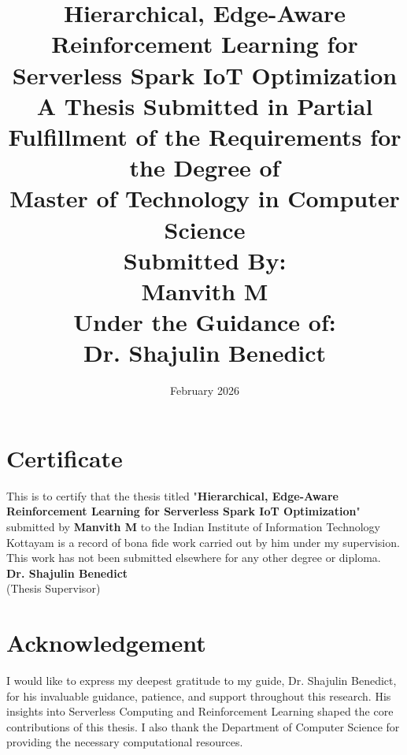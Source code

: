 \documentclass[12pt, a4paper]{report}
\title{\textbf{Hierarchical, Edge-Aware Reinforcement Learning for Serverless Spark IoT Optimization}\\
\vspace{1cm}
\large A Thesis Submitted in Partial Fulfillment of the Requirements for the Degree of\\
\textbf{Master of Technology in Computer Science}\\
\vspace{2cm}
\textbf{Submitted By:}\\
\textbf{Manvith M}\\
\vspace{1cm}
\textbf{Under the Guidance of:}\\
\textbf{Dr. Shajulin Benedict}}
\date{February 2026}
\begin{document}
\maketitle

\chapter*{Certificate}
This is to certify that the thesis titled "\textbf{Hierarchical, Edge-Aware Reinforcement Learning for Serverless Spark IoT Optimization}" submitted by \textbf{Manvith M} to the Indian Institute of Information Technology Kottayam is a record of bona fide work carried out by him under my supervision. This work has not been submitted elsewhere for any other degree or diploma.
\vspace{3cm}
\\
\textbf{Dr. Shajulin Benedict}\\
(Thesis Supervisor)
\clearpage

\chapter*{Acknowledgement}
I would like to express my deepest gratitude to my guide, Dr. Shajulin Benedict, for his invaluable guidance, patience, and support throughout this research. His insights into Serverless Computing and Reinforcement Learning shaped the core contributions of this thesis. I also thank the Department of Computer Science for providing the necessary computational resources.
\clearpage
\end{document}
